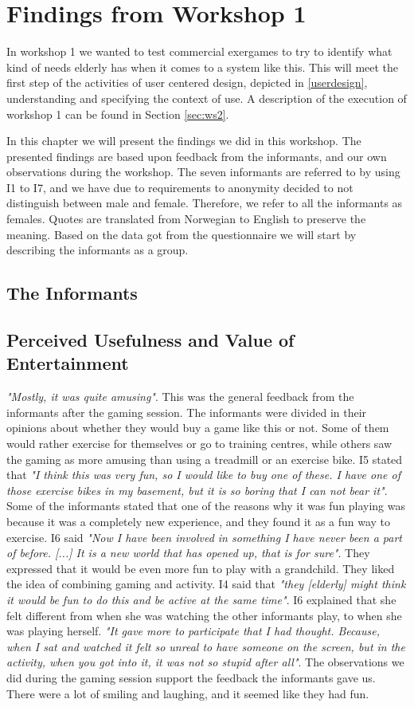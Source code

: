 \chapter{Findings from Workshop 1}
\label{chap:findW1}
In workshop 1 we wanted to test commercial exergames to try to identify what kind of needs elderly has when it comes to a system like this. This will meet the first step of the activities of user centered design, depicted in \ref{userdesign}, understanding and specifying the context of use. A description of the execution of workshop 1 can be found in Section \ref{sec:ws2}. 

In this chapter we will present the findings we did in this workshop. The presented findings are based upon feedback from the informants, and our own observations during the workshop. The seven informants are referred to by using I1 to I7, and we have due to requirements to anonymity decided to not distinguish between male and female. Therefore, we refer to all the informants as females. Quotes are translated from Norwegian to English to  preserve the meaning. Based on the data got from the questionnaire we will start by describing the informants as a group.

\section{The Informants}


\section{Perceived Usefulness and Value of Entertainment}
\emph{"Mostly, it was quite amusing"}. This was the general feedback from the informants after the gaming session. The informants were divided in their opinions about whether they would buy a game like this or not. Some of them would rather exercise for themselves or go to training centres, while others saw the gaming as more amusing than using a treadmill or an exercise bike. I5 stated that \emph{"I think this was very fun, so I would like to buy one of these. I have one of those exercise bikes in my basement, but it is so boring that I can not bear it"}.  Some of the informants stated that one of the reasons why it was fun playing was because it was a completely new experience, and they found it as a fun way to exercise. I6 said \emph{"Now I have been involved in something I have never been a part of before. [...] It is a new world that has opened up, that is for sure"}. They expressed that it would be even more fun to play with a grandchild. They liked the idea of combining gaming and activity. I4 said that \emph{"they [elderly] might think it would be fun to do this and be active at the same time"}. I6 explained that she felt different from when she was watching the other informants play, to when she was playing herself. \emph{"It gave more to participate that I had thought. Because, when I sat and watched it felt so unreal to have someone on the screen, but in the activity, when you got into it, it was not so stupid after all"}. The observations we did during the gaming session support the feedback the informants gave us. There were a lot of smiling and laughing, and it seemed like they had fun.  

